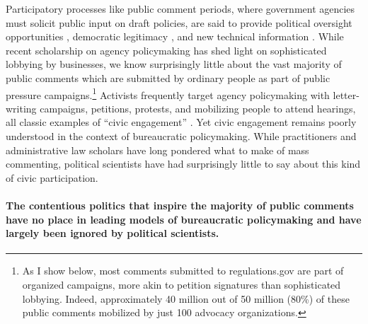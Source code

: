 \documentclass[
      12pt,
        ]{article}
\begin{document}
Participatory processes like public comment periods, where government
agencies must solicit public input on draft policies, are said to provide political oversight opportunities \citep{Balla1998, Mccubbins1984}, democratic legitimacy \citep{Croley2003, Rosenbloom2003}, and new technical information \citep{Yackee2006JPART, Nelson2012}. While recent scholarship on agency policymaking has shed light on sophisticated lobbying by businesses, we know surprisingly little about the vast majority of public comments which are submitted by ordinary people as part of public pressure campaigns.\footnote{
  As I show below, most comments submitted to
  regulations.gov are part of organized campaigns, more akin to petition signatures than sophisticated lobbying. Indeed, approximately 40 million out of
  50 million (80\%) of these public comments mobilized by just 100
  advocacy organizations.}
Activists frequently target agency policymaking with letter-writing campaigns, petitions, protests,
and mobilizing people to attend hearings, all classic examples of ``civic engagement'' \citep{Verba1987}. Yet civic engagement remains poorly understood in the context of bureaucratic policymaking.
While practitioners and administrative law scholars have long pondered
what to make of mass commenting, political scientists have had
surprisingly little to say about this kind of civic participation.

\hypertarget{the-contentious-politics-that-inspire-the-majority-of-public-comments-have-no-place-in-leading-models-of-bureaucratic-policymaking-and-have-largely-been-ignored-by-political-scientists.}{%
\paragraph{The contentious politics that inspire the majority of public comments have no place in leading models of bureaucratic policymaking and have largely been ignored by political scientists.}\label{the-contentious-politics-that-inspire-the-majority-of-public-comments-have-no-place-in-leading-models-of-bureaucratic-policymaking-and-have-largely-been-ignored-by-political-scientists.}}
\end{document}
